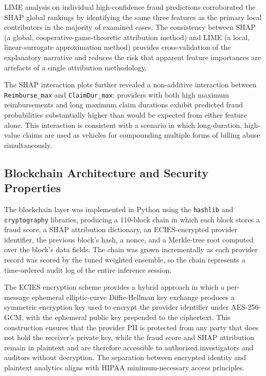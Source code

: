 LIME analysis on individual high-confidence fraud predictions corroborated the SHAP global rankings by identifying the same three features as the primary local contributors in the majority of examined cases. The consistency between SHAP (a global, cooperative-game-theoretic attribution method) and LIME (a local, linear-surrogate approximation method) provides cross-validation of the explanatory narrative and reduces the risk that apparent feature importances are artefacts of a single attribution methodology.

The SHAP interaction plots further revealed a non-additive interaction between \texttt{Reimburse\_max} and \texttt{ClaimDur\_max}: providers with both high maximum reimbursements and long maximum claim durations exhibit predicted fraud probabilities substantially higher than would be expected from either feature alone. This interaction is consistent with a scenario in which long-duration, high-value claims are used as vehicles for compounding multiple forms of billing abuse simultaneously.

\subsection{Blockchain Architecture and Security Properties}

The blockchain layer was implemented in Python using the \texttt{hashlib} and \texttt{cryptography} libraries, producing a 110-block chain in which each block stores a fraud score, a SHAP attribution dictionary, an ECIES-encrypted provider identifier, the previous block's hash, a nonce, and a Merkle-tree root computed over the block's data fields. The chain was grown incrementally as each provider record was scored by the tuned weighted ensemble, so the chain represents a time-ordered audit log of the entire inference session.

The ECIES encryption scheme provides a hybrid approach in which a per-message ephemeral elliptic-curve Diffie-Hellman key exchange produces a symmetric encryption key used to encrypt the provider identifier under AES-256-GCM, with the ephemeral public key prepended to the ciphertext. This construction ensures that the provider PII is protected from any party that does not hold the receiver's private key, while the fraud score and SHAP attribution remain in plaintext and are therefore accessible to authorised investigators and auditors without decryption. The separation between encrypted identity and plaintext analytics aligns with HIPAA minimum-necessary access principles.

